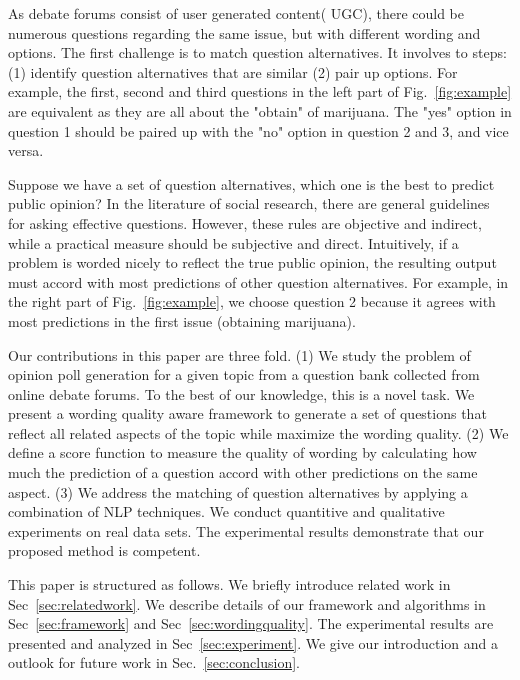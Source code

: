 \documentclass{llncs}
\begin{document}
As debate forums consist of user generated content( UGC), there could be numerous questions regarding the same issue, but with different wording and options. The first challenge is to match question alternatives. It involves to steps: (1) identify question alternatives that are similar (2) pair up options. For example, the first, second and third questions  in the left part of Fig.~\ref{fig:example} are equivalent as they are all about the "obtain" of marijuana. The "yes" option in question 1 should be paired up with the "no" option in question 2 and 3, and vice versa.

Suppose we have a set of question alternatives, which one is the best to predict public opinion? In the literature of social research, there are general guidelines~\cite{Trochim2000Research} for asking effective questions. However, these rules are objective and indirect, while a practical measure should be subjective and direct. Intuitively, if a problem is worded nicely to reflect the true public opinion, the resulting output must accord with most predictions of other question alternatives. For example, in the right part of Fig.~\ref{fig:example}, we choose question 2 because it agrees with most predictions in the first issue (obtaining marijuana). 




Our contributions in this paper are three fold. (1) We study the problem of opinion poll generation for a given topic from a question bank collected from online debate forums. To the best of our knowledge, this is a novel task. We present a wording quality aware framework to generate a set of questions that reflect all related aspects of the topic while maximize the wording quality. (2) We define a score function to measure the quality of wording by calculating how much the prediction of a question accord with other predictions on the same aspect. (3) We address the matching of question alternatives by applying a combination of NLP techniques. We conduct quantitive and qualitative experiments on real data sets. The experimental results demonstrate that our proposed method is competent. 





This paper is structured as follows. We briefly introduce related work in Sec~\ref{sec:relatedwork}. We describe details of our framework and algorithms in Sec~\ref{sec:framework} and Sec~\ref{sec:wordingquality}. The experimental results are presented and analyzed in Sec~\ref{sec:experiment}. We give our introduction and a outlook for future work in Sec.~\ref{sec:conclusion}.
\end{document}

